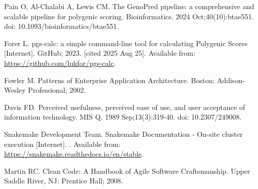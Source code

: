 \begin{thebibliography}{10}
       Pain O, Al-Chalabi A, Lewis CM.
       \newblock The GenoPred pipeline: a comprehensive and scalable pipeline for polygenic scoring.
       \newblock Bioinformatics. 2024 Oct;40(10):btae551. doi: 10.1093/bioinformatics/btae551.

       Forer L.
       \newblock pgs-calc: a simple command-line tool for calculating Polygenic Scores [Internet].
       \newblock GitHub; 2023. [cited 2025 Aug 25]. Available from: \url{https://github.com/lukfor/pgs-calc}.

       Fowler M.
       \newblock Patterns of Enterprise Application Architecture.
       \newblock Boston: Addison-Wesley Professional; 2002.

       Davis FD.
       \newblock Perceived usefulness, perceived ease of use, and user acceptance of information technology.
       \newblock MIS Q. 1989 Sep;13(3):319-40. doi: 10.2307/249008.

       Snakemake Development Team.
       \newblock Snakemake Documentation - On-site cluster execution [Internet].
       . Available from: \url{https://snakemake.readthedocs.io/en/stable}.
    
       Martin RC.
       \newblock Clean Code: A Handbook of Agile Software Craftsmanship.
       \newblock Upper Saddle River, NJ: Prentice Hall; 2008.

\end{thebibliography}
\cleardoublepage